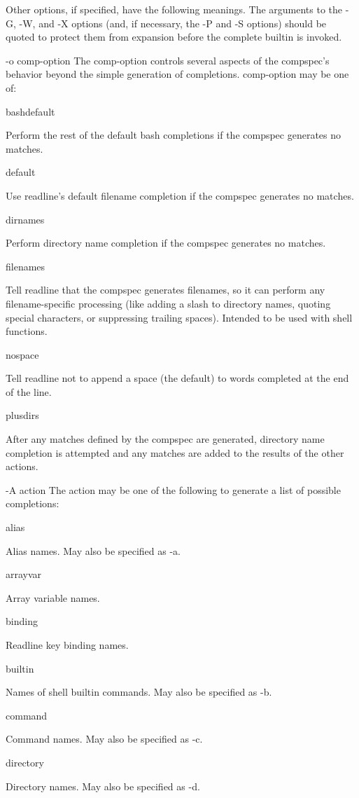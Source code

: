 Other options, if specified, have the following meanings. The arguments to the -G, -W, and -X options (and, if necessary, the -P and -S options) should be quoted to protect them from expansion before the complete builtin is invoked.

-o comp-option
The comp-option controls several aspects of the compspec's behavior beyond the simple generation of completions. comp-option may be one of:

bashdefault

Perform the rest of the default bash completions if the compspec generates no matches.

default

Use readline's default filename completion if the compspec generates no matches.

dirnames

Perform directory name completion if the compspec generates no matches.

filenames

Tell readline that the compspec generates filenames, so it can perform any filename-specific processing (like adding a slash to directory names, quoting special characters, or suppressing trailing spaces). Intended to be used with shell functions.

nospace

Tell readline not to append a space (the default) to words completed at the end of the line.

plusdirs

After any matches defined by the compspec are generated, directory name completion is attempted and any matches are added to the results of the other actions.

-A action
The action may be one of the following to generate a list of possible completions:

alias

Alias names. May also be specified as -a.

arrayvar

Array variable names.

binding

Readline key binding names.

builtin

Names of shell builtin commands. May also be specified as -b.

command

Command names. May also be specified as -c.

directory

Directory names. May also be specified as -d.

